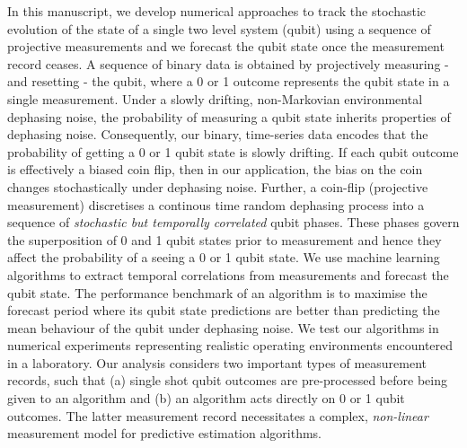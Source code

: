 In this manuscript, we develop numerical approaches to track the stochastic evolution of the state of a single two level system (qubit) using a sequence of projective measurements and we forecast the qubit state once the measurement record ceases. A sequence of binary data is obtained by projectively measuring - and resetting - the qubit, where  a 0 or 1 outcome represents the qubit state in a single measurement. Under a slowly drifting, non-Markovian environmental dephasing noise, the probability of measuring a qubit state inherits properties of dephasing noise. Consequently, our binary, time-series data encodes that the probability of getting a 0 or 1 qubit state is slowly drifting. If each qubit outcome is effectively a biased coin flip, then in our application, the bias on the coin changes stochastically under dephasing noise. Further, a coin-flip (projective measurement) discretises a continous time random dephasing process into a sequence of \textit{stochastic but temporally correlated} qubit phases. These phases govern the superposition of 0 and 1 qubit states prior to measurement and hence they affect the probability of a seeing a 0 or 1 qubit state. We use machine learning algorithms to extract temporal correlations from measurements and forecast the qubit state. The performance benchmark of an algorithm is to maximise the forecast period where its qubit state predictions are better than predicting the mean behaviour of the qubit under dephasing noise. We test our algorithms in numerical experiments representing realistic operating environments encountered in a laboratory. Our analysis considers two important types of measurement records, such that (a) single shot qubit outcomes are pre-processed before being given to an algorithm and (b) an algorithm acts directly on 0 or 1 qubit outcomes. The latter measurement record necessitates a complex, \textit{non-linear} measurement model for predictive estimation algorithms.
\\
\\
